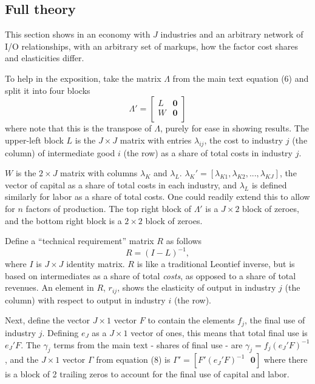 \documentclass[11pt]{article}
\begin{document}
\subsection{Full theory}
This section shows in an economy with $J$ industries and an arbitrary network of I/O relationships, with an arbitrary set of markups, how the factor cost shares and elasticities differ. 

To help in the exposition, take the matrix $\Lambda$ from the main text equation (6) and split it into four blocks
\begin{equation}
	\Lambda' = 
	\begin{bmatrix}
		L & \mathbf{0} \\
		W & \mathbf{0} \\
	\end{bmatrix} \label{EQ_Lambda_app}
\end{equation}
where note that this is the transpose of $\Lambda$, purely for ease in showing results. The upper-left block $L$ is the $J \times J$ matrix with entries $\lambda_{ij}$, the cost to industry $j$ (the column) of intermediate good $i$ (the row) as a share of total costs in industry $j$. 

$W$ is the $2 \times J$ matrix with columns $\lambda_K$ and $\lambda_L$. $\lambda_K' = [\lambda_{K1}, \lambda_{K2}, ..., \lambda_{KJ}]$, the vector of capital as a share of total costs in each industry, and $\lambda_L$ is defined similarly for labor as a share of total costs. One could readily extend this to allow for $n$ factors of production. The top right block of $\Lambda'$ is a $J \times 2$ block of zeroes, and the bottom right block is a $2 \times 2$ block of zeroes. 

Define a ``technical requirement'' matrix $R$ as follows
\begin{equation}
	R = (I - L)^{-1},
\end{equation}
where $I$ is $J \times J$ identity matrix. $R$ is like a traditional Leontief inverse, but is based on intermediates as a share of total \textit{costs}, as opposed to a share of total revenues. An element in $R$, $r_{ij}$, shows the elasticity of output in industry $j$ (the column) with respect to output in industry $i$ (the row).

Next, define the vector $J \times 1$ vector $F$ to contain the elements $f_j$, the final use of industry $j$. Defining $e_J$ as a $J \times 1$ vector of ones, this means that total final use is $e_J'F$. The $\gamma_j$ terms from the main text - shares of final use - are $\gamma_j = f_j(e_J'F)^{-1}$, and the $J \times 1$ vector $\Gamma$ from equation (8) is $\Gamma' = [F'(e_J'F)^{-1} \text{ } \mathbf{0}]$ where there is a block of 2 trailing zeros to account for the final use of capital and labor.
\end{document}
